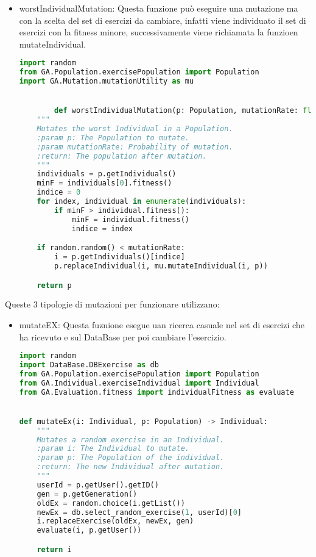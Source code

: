 \documentclass{article}
\begin{document}
    \begin{itemize}
        \item worstIndividualMutation: Questa funzione può eseguire una mutazione ma con la scelta del set di esercizi da cambiare, infatti viene individuato il set di esercizi con la fitness minore, successivamente viene richiamata la funzioen mutateIndividual.
        \begin{lstlisting}[language=Python, breaklines, no caption]
import random
from GA.Population.exercisePopulation import Population
import GA.Mutation.mutationUtility as mu


        def worstIndividualMutation(p: Population, mutationRate: float) -> Population:
    """
    Mutates the worst Individual in a Population.
    :param p: The Population to mutate.
    :param mutationRate: Probability of mutation.
    :return: The population after mutation.
    """
    individuals = p.getIndividuals()
    minF = individuals[0].fitness()
    indice = 0
    for index, individual in enumerate(individuals):
        if minF > individual.fitness():
            minF = individual.fitness()
            indice = index

    if random.random() < mutationRate:
        i = p.getIndividuals()[indice]
        p.replaceIndividual(i, mu.mutateIndividual(i, p))

    return p
        \end{lstlisting}
    \end{itemize}
    Queste 3 tipologie di mutazioni per funzionare utilizzano:
    \begin{itemize}
        \item mutateEX: Questa fuznione esegue uan ricerca casuale nel set di esercizi che ha ricevuto e sul DataBase per poi cambiare l'esercizio.
        \begin{lstlisting}[language=Python, breaklines, no caption]
import random
import DataBase.DBExercise as db
from GA.Population.exercisePopulation import Population
from GA.Individual.exerciseIndividual import Individual
from GA.Evaluation.fitness import individualFitness as evaluate


def mutateEx(i: Individual, p: Population) -> Individual:
    """
    Mutates a random exercise in an Individual.
    :param i: The Individual to mutate.
    :param p: The Population of the individual.
    :return: The new Individual after mutation.
    """
    userId = p.getUser().getID()
    gen = p.getGeneration()
    oldEx = random.choice(i.getList())
    newEx = db.select_random_exercise(1, userId)[0]
    i.replaceExercise(oldEx, newEx, gen)
    evaluate(i, p.getUser())

    return i
        \end{lstlisting}
    \end{itemize}
\end{document}

